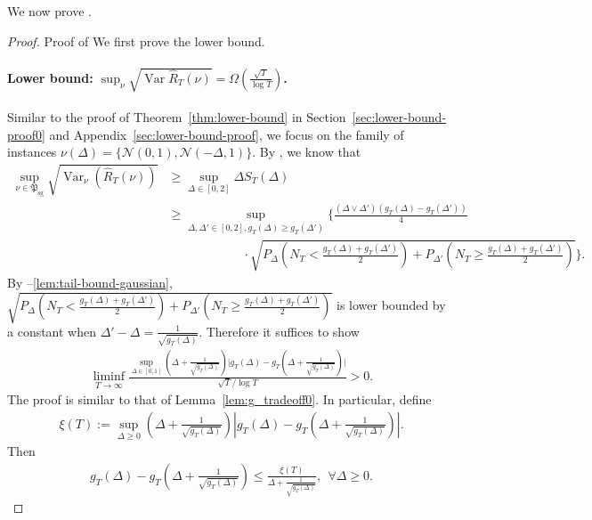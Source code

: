 \documentclass[nonblindrev]{informs3_noinforms}
\newcommand{\var}{\operatorname{Var}}
\begin{document}
We now prove .
\begin{proof}{Proof of }
    We first prove the lower bound.

    \paragraph{Lower bound: $\sup_{\nu}\sqrt{\var \hat R_T(\nu)} = \Omega\left(\frac{\sqrt{T}}{\log T}\right)$.}
    Similar to the proof of Theorem~\ref{thm:lower-bound} in Section~\ref{sec:lower-bound-proof0} and Appendix~\ref{sec:lower-bound-proof}, we focus on the family of instances $\nu(\Delta) = \{\mathcal{N}(0, 1), \mathcal{N}(-\Delta, 1)\}$. By , we know that 
    \begin{align*}        \sup_{\nu\in\mathfrak{P}_{\text{sg}}}\sqrt{\var_{\nu}(\hat R_T(\nu))}&\ge\sup_{\Delta \in [0 ,2]}\Delta S_T(\Delta)\\
        &\geq\sup_{\Delta,\Delta'\in[0,2], g_T(\Delta)\geq g_T(\Delta')}\Bigg\{\frac{(\Delta\vee\Delta')(g_T(\Delta)-g_T(\Delta'))}{4}\\
        &\qquad\qquad\qquad\cdot\sqrt{P_{\Delta}\left(N_T<\frac{g_T(\Delta)+g_T(\Delta')}{2}\right)+P_{\Delta'}\left(N_T\geq\frac{g_T(\Delta)+g_T(\Delta')}{2}\right)}\Bigg\}.
    \end{align*}
    By --\ref{lem:tail-bound-gaussian}, $\sqrt{P_{\Delta}\left(N_T<\frac{g_T(\Delta)+g_T(\Delta')}{2}\right)+P_{\Delta'}\left(N_T\geq\frac{g_T(\Delta)+g_T(\Delta')}{2}\right)}$ is lower bounded by a constant when $\Delta'-\Delta=\frac{1}{\sqrt{g_T(\Delta)}}$. Therefore it suffices to show
    \begin{align*}      \liminf_{T\rightarrow\infty}\frac{\sup_{\Delta\in[0,1]}\left(\Delta+\frac{1}{\sqrt{g_T(\Delta)}}\right)\Big|g_T(\Delta)-g_T\left(\Delta+\frac{1}{\sqrt{g_T(\Delta)}}\right)\Big|}{\sqrt{T}/\log T}>0.
    \end{align*}
    The proof is similar to that of Lemma~\ref{lem:g_tradeoff0}. In particular, define    
    \begin{align*}
        \xi(T):=\sup_{\Delta\geq 0}\left(\Delta+\frac{1}{\sqrt{g_T(\Delta)}}\right)\left|g_T(\Delta)-g_T\left(\Delta+\frac{1}{\sqrt{g_T(\Delta)}}\right)\right|.
    \end{align*}
    Then    \begin{align}\label{eq:g_different_uppbound2}
        g_T(\Delta)-g_T\left(\Delta+\frac{1}{\sqrt{g_T(\Delta)}}\right)\leq\frac{\xi(T)}{\Delta+\frac{1}{\sqrt{g_T(\Delta)}}}, \ \ \forall\Delta\geq 0.

\end{align}
\end{proof}
\end{document}
